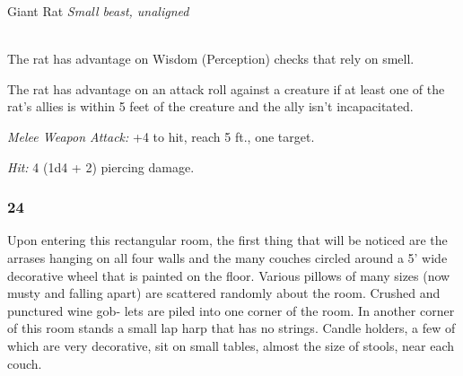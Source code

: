 \documentclass[palace_of_the_silver_princess]{subfiles}
\begin{document}
\begin{monsterbox}{Giant Rat}
    \textit{Small beast, unaligned}\\
    \hline
    \basics[%
        armorclass = 12,
        hitpoints  = 7 (2d6),
        speed      = {30 ft.}
    ]
    \hline
    \stats[
        STR = \stat{7},
        DEX = \stat{15},
        CON = \stat{11},
        INT = \stat{2},
        WIS = \stat{10},
        CHA = \stat{4}
    ]
    \hline
    \details[
        senses = {darkvision 60 ft., passive Perception 10},
        languages = {---},
        challenge = {1/8 (25 XP)},
    ]
    \hline
    \\[1mm]
    \begin{monsteraction}
        The rat has advantage on Wisdom (Perception) checks that rely on
        smell.
    \end{monsteraction}

    \begin{monsteraction}
        The rat has advantage on an attack roll against a creature if at
        least one of the rat's allies is within 5 feet of the creature
        and the ally isn't incapacitated.
    \end{monsteraction}
    \begin{monsteraction}[Bite]
        \textit{Melee Weapon Attack:} +4 to hit, reach 5 ft., one
        target.

        \textit{Hit:} 4 (1d4 + 2) piercing damage.
    \end{monsteraction}
\end{monsterbox}

\subsubsection{24}
\begin{quotebox}
    Upon entering this rectangular room, the first thing that will be
    noticed are the arrases hanging on all four walls and the many
    couches circled around a 5’ wide decorative wheel that is painted on
    the floor. Various pillows of many sizes (now musty and falling
    apart) are scattered randomly about the room. Crushed and punctured
    wine gob- lets are piled into one corner of the room. In another
    corner of this room stands a small lap harp that has no strings.
    Candle holders, a few of which are very decorative, sit on small
    tables, almost the size of stools, near each couch.
\end{quotebox}
\end{document}
